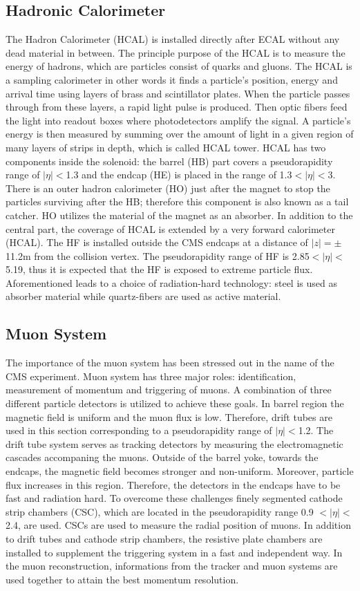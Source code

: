 \subsection{Hadronic Calorimeter}
The Hadron Calorimeter (HCAL) is installed directly after ECAL without any dead material in between.
The principle purpose of the HCAL is to measure the energy of hadrons, which are particles consist of quarks and gluons.
The HCAL is a sampling calorimeter in other words it finds a particle’s position, energy and arrival time using layers of brass and scintillator plates. When the particle passes through from these layers, a rapid light pulse is produced. Then optic fibers feed the light into readout boxes where photodetectors amplify the signal. A particle’s energy is then measured by summing over the amount of light in a given region of many layers of strips in depth, which is called HCAL tower.
HCAL has two components inside the solenoid: the barrel (HB) part covers a pseudorapidity range of $|\eta|<$1.3 and the endcap (HE) is placed in the range of 1.3$<|\eta|<$3. There is an outer hadron calorimeter (HO) just after the magnet to stop the particles surviving after the HB; therefore this component is also known as a tail catcher. HO utilizes the material of the magnet as an absorber. In addition to the central part, the coverage of HCAL is extended by a very forward calorimeter (HCAL). The HF is installed outside the CMS endcaps at a distance of $|z|=\pm$11.2m from the collision vertex. The pseudorapidity range of HF is 2.85$<|\eta|<$ 5.19, thus it is expected that the HF is exposed to extreme particle flux. Aforementioned leads to a choice of radiation-hard technology: steel is used as absorber material while quartz-fibers are used as active material.
\subsection{Muon System}
The importance of the muon system has been stressed out in the name of the CMS experiment.
Muon system has three major roles: identification, measurement of momentum and triggering of muons. A combination of three different particle detectors is utilized to achieve these goals. In barrel region the magnetic field is uniform and the muon flux is low. Therefore, drift tubes are used in this section corresponding to a pseudorapidity range of $|\eta|<$1.2. The drift tube system serves as tracking detectors by measuring the electromagnetic cascades accompaning the muons. Outside of the barrel yoke, towards the endcaps, the magnetic field becomes stronger and non-uniform. Moreover, particle flux increases in this region. Therefore, the detectors in the endcaps have to be fast and radiation hard. To overcome these challenges finely segmented cathode strip chambers (CSC), which are located in the pseudorapidity range 0.9 $<|\eta|<$2.4, are used. CSCs are used to measure the radial position of muons. In addition to drift tubes and cathode strip chambers, the resistive plate chambers are installed to supplement the triggering system in a fast and independent way.
In the muon reconstruction, informations from the tracker and muon systems are used together to attain the best momentum resolution. 
